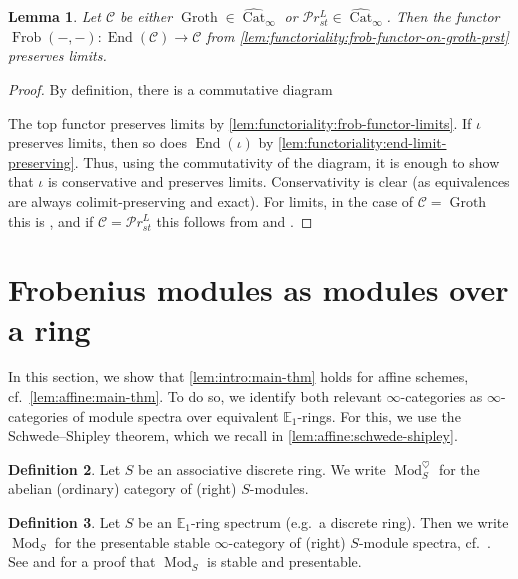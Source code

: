 \documentclass{article}
\theoremstyle{definition}
\newtheorem{defn}{Definition}[section]
\theoremstyle{definition}
\theoremstyle{definition}
\theoremstyle{plain}
\newtheorem{lem}[defn]{Lemma}
\theoremstyle{plain}
\theoremstyle{plain}
\theoremstyle{plain}
\theoremstyle{plain}
\theoremstyle{plain}
\theoremstyle{plain}
\theoremstyle{plain}
\theoremstyle{remark}
\theoremstyle{remark}
\theoremstyle{plain}
\theoremstyle{plain}
\theoremstyle{plain}
\theoremstyle{plain}
\theoremstyle{plain}
\newcommand{\Mod}[1]{\operatorname{Mod}_{#1}}
\newcommand{\ModDisc}[1]{\operatorname{Mod}_{#1}^{\heartsuit}}
\newcommand{\Frob}[2]{\operatorname{Frob}(#1, #2)}
\newcommand{\End}[1]{\operatorname{End}(#1)}
\newcommand{\Cat}[1]{\mathcal{#1}}
\newcommand{\CatInf}{\operatorname{Cat}_{\infty}}
\newcommand{\CatInfHuge}{\widehat{\operatorname{Cat}}_{\infty}}
\newcommand{\Groth}{\operatorname{Groth}}
\newcommand{\PrSt}{\mathcal{P}r^{L}_{st}}
\begin{document}
\begin{lem} \label{lem:functoriality:frob-functor-on-groth-prst-limits}
    Let $\Cat C$ be either $\Groth \in \CatInfHuge$ or $\PrSt \in \CatInfHuge$.
    Then the functor $\Frob{-}{-} \colon \End{\Cat C} \to \Cat C$ 
    from \cref{lem:functoriality:frob-functor-on-groth-prst}
    preserves limits.
\end{lem}
\begin{proof}
    By definition, there is a commutative diagram 
    \begin{center}
    \end{center}
    The top functor preserves limits by \cref{lem:functoriality:frob-functor-limits}.
    If $\iota$ preserves limits, then so does $\End{\iota}$ by \cref{lem:functoriality:end-limit-preserving}.
    Thus, using the commutativity of the diagram, it is enough to show that $\iota$ is conservative and preserves limits.
    Conservativity is clear (as equivalences are always colimit-preserving and exact).
    For limits, in the case of $\Cat C = \Groth$ this is \cite[Proposition C.5.4.21]{sag},
    and if $\Cat C = \PrSt$ this follows from \cite[Proposition 4.8.2.18]{higheralgebra} and \cite[Proposition 5.5.3.13]{highertopoi}.
\end{proof}

\section{Frobenius modules as modules over a ring}
In this section, we show that \cref{lem:intro:main-thm} holds for affine schemes, cf.\ \cref{lem:affine:main-thm}.
To do so, we identify both relevant $\infty$-categories as $\infty$-categories of module spectra over equivalent $\mathbb{E}_1$-rings.
For this, we use the Schwede--Shipley theorem, which we recall in \cref{lem:affine:schwede-shipley}.

\begin{defn}
    Let $S$ be an associative discrete ring.
    We write $\ModDisc{S}$ for the abelian (ordinary) category of (right)
    $S$-modules.
\end{defn}

\begin{defn}
    Let $S$ be an $\mathbb{E}_1$-ring spectrum (e.g.\ a discrete ring).
    Then we write $\Mod{S}$ for the presentable stable $\infty$-category of (right) $S$-module spectra,
    cf.\ \cite[Definition 7.1.1.2]{higheralgebra}.
    See \cite[Corollary 7.1.1.5]{higheralgebra} and \cite[Corollary 4.2.3.7]{higheralgebra} for a proof that $\Mod{S}$ is stable and presentable.
\end{defn}
\end{document}
